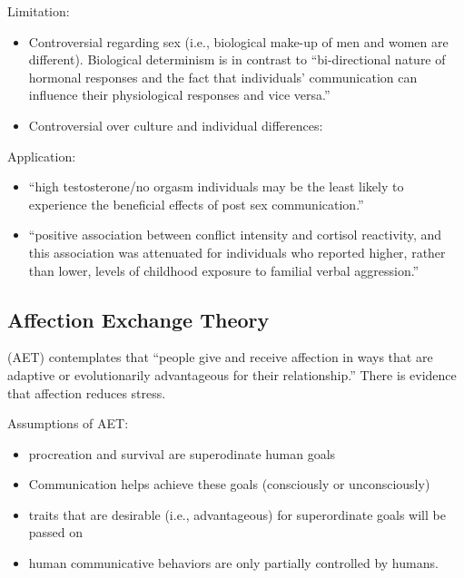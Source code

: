 \documentclass[
]{book}
\providecommand{\tightlist}{%
  \setlength{\itemsep}{0pt}\setlength{\parskip}{0pt}}
\begin{document}
Limitation:

\begin{itemize}
\tightlist
\item
  Controversial regarding sex (i.e., biological make-up of men and women are different). Biological determinism is in
  contrast to ``bi-directional nature of hormonal responses and the fact that individuals' communication can influence
  their physiological responses and vice versa.''
\item
  Controversial over culture and individual differences:
\end{itemize}

Application:

\begin{itemize}
\tightlist
\item
  \citep{Denes_2016} ``high testosterone/no orgasm individuals may be the least likely to experience the beneficial effects
  of post sex communication.''
\item
  \citep{Aloia_2014} ``positive association between conflict intensity and cortisol reactivity, and this association was
  attenuated for individuals who reported higher, rather than lower, levels of childhood exposure to familial verbal
  aggression.''
\end{itemize}

\hypertarget{affection-exchange-theory}{%
\subsection{Affection Exchange Theory}\label{affection-exchange-theory}}

(AET) \citep{Floyd_2001} contemplates that ``people give and receive affection in ways that are adaptive or evolutionarily
advantageous for their relationship.'' There is evidence that affection reduces stress.

Assumptions of AET:

\begin{itemize}
\tightlist
\item
  procreation and survival are superodinate human goals
\item
  Communication helps achieve these goals (consciously or unconsciously)
\item
  traits that are desirable (i.e., advantageous) for superordinate goals will be passed on
\item
  human communicative behaviors are only partially controlled by humans.
\end{itemize}
\end{document}
